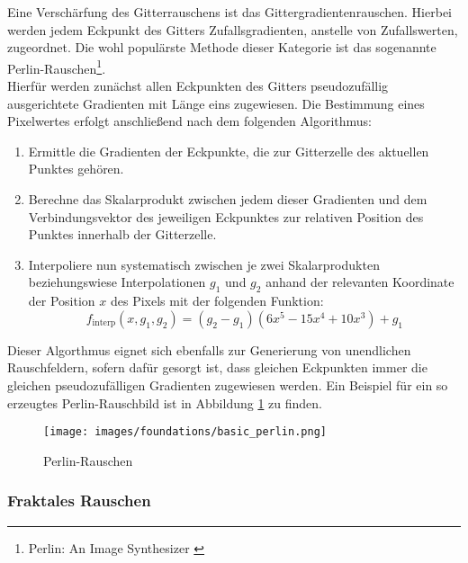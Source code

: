 Eine Verschärfung des Gitterrauschens ist das Gittergradientenrauschen. Hierbei werden jedem Eckpunkt des Gitters Zufallsgradienten, anstelle von Zufallswerten, zugeordnet. Die wohl populärste Methode dieser Kategorie ist das sogenannte Perlin-Rauschen\footnote{
    Perlin: An Image Synthesizer
    \cite{perlin1985image}
}. \\
Hierfür werden zunächst allen Eckpunkten des Gitters pseudozufällig ausgerichtete Gradienten mit Länge eins zugewiesen. Die Bestimmung eines Pixelwertes erfolgt anschließend nach dem folgenden Algorithmus:
\begin{enumerate}
    \item Ermittle die Gradienten der Eckpunkte, die zur Gitterzelle des aktuellen Punktes gehören.
    \item Berechne das Skalarprodukt zwischen jedem dieser Gradienten und dem Verbindungsvektor des jeweiligen Eckpunktes zur relativen Position des Punktes innerhalb der Gitterzelle.
    \item Interpoliere nun systematisch zwischen je zwei Skalarprodukten beziehungswiese Interpolationen $g_1$ und $g_2$ anhand der relevanten Koordinate der Position $x$ des Pixels mit der folgenden Funktion:
    \begin{equation}
        f_\text{interp}(x, g_1, g_2) = (g_2 - g_1)(6x^5 - 15x^4 + 10x^3) 
        + g_1
    \end{equation}
\end{enumerate}
Dieser Algorthmus eignet sich ebenfalls zur Generierung von unendlichen Rauschfeldern, sofern dafür gesorgt ist, dass gleichen Eckpunkten immer die gleichen pseudozufälligen Gradienten zugewiesen werden. Ein Beispiel für ein so erzeugtes Perlin-Rauschbild ist in Abbildung \ref{fig:basic_perlin} zu finden.
\begin{figure}[ht]
    \centering
    \texttt{[image: images/foundations/basic\_perlin.png]} 
    \caption{Perlin-Rauschen}
    \label{fig:basic_perlin}
\end{figure}


\subsubsection{Fraktales Rauschen}

